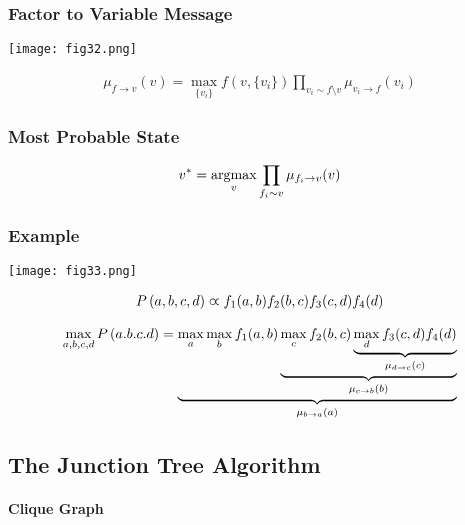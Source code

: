 \subsubsection*{Factor to Variable Message}

\begin{minipage}{0.4\textwidth}
	\centering
	\texttt{[image: fig32.png]}
\end{minipage}
\begin{minipage}{0.6\textwidth}
	\begin{align*}
	\mu_{f\to v}(v)=\max_{\{v_i\}}f(v,\{v_i\})\prod_{v_i\sim f\setminus v}\mu_{v_i\to f}(v_i)
	\end{align*}
\end{minipage}

\subsubsection*{Most Probable State}

\begin{align*}
v^*=\argmax_v\prod_{f_i\sim v}\mu_{f_i\to v}(v)
\end{align*}

\subsubsection*{Example}

\begin{minipage}{0.4\textwidth}
	\centering
	\texttt{[image: fig33.png]}
\end{minipage}
\begin{minipage}{0.6\textwidth}
	\begin{align*}
	P\left(a,b,c,d\right)\varpropto f_1(a,b)f_2(b,c)f_3(c,d)f_4(d)
	\end{align*}
\end{minipage}

\begin{align*}
\max_{a,b,c,d}P\left(a.b.c.d\right)=\underbrace{\max_a\max_bf_1(a,b)\underbrace{\max_cf_2(b,c)\underbrace{\max_df_3(c,d)f_4(d)}_\text{$\mu_{d\to c}(c)$}}_\text{$\mu_{c\to b}(b)$}}_\text{$\mu_{b\to a}(a)$}
\end{align*}

\subsection{The Junction Tree Algorithm}

\paragraph{Clique Graph}

